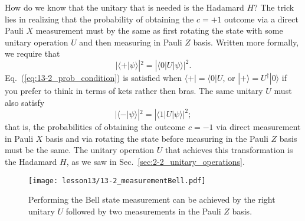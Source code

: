 How do we know that the unitary that is needed is the Hadamard $H$?
The trick lies in realizing that the probability of obtaining the $c=+1$ outcome via a direct Pauli $X$ measurement must by the same as first rotating the state with some unitary operation $U$ and then measuring in Pauli $Z$ basis.
Written more formally, we require that
\begin{equation}
    |\langle+|\psi\rangle|^2 = |\langle0|U|\psi\rangle|^2.
    \label{eq:13-2_prob_condition}
\end{equation}
Eq.~(\ref{eq:13-2_prob_condition}) is satisfied when $\langle+|=\langle0|U$, or $|+\rangle=U^{\dagger}|0\rangle$ if you prefer to think in terms of kets rather then bras.
The same unitary $U$ must also satisfy
\begin{equation}
    |\langle-|\psi\rangle|^2 = |\langle1|U|\psi\rangle|^2;
\end{equation}
that is, the probabilities of obtaining the outcome $c=-1$ via direct measurement in Pauli $X$ basis and via rotating the state before measuring in the Pauli $Z$ basis must be the same.
The unitary operation $U$ that achieves this transformation is the Hadamard $H$, as we saw in Sec.~\ref{sec:2-2_unitary_operations}.

\begin{figure}
    \centering
    \texttt{[image: lesson13/13-2\_measurementBell.pdf]}
    \caption[Bell state measurement via Pauli Z measurements]{Performing the Bell state measurement can be achieved by the right unitary $U$ followed by two measurements in the Pauli $Z$ basis.}
    \label{fig:13-2_measurementBell}
\end{figure}

